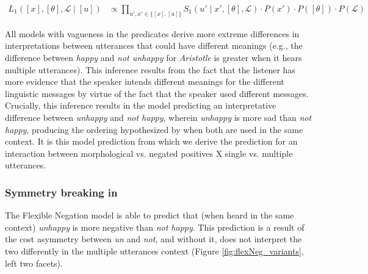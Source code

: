 \documentclass[floatsintext,doc]{apa6}
\begin{document}
\begin{align}
L_{1}([x], [\theta], \mathcal{L} \mid [u]) &\propto \prod_{{u', x'} \in \{[x],[u]\}} S_{1}(u' \mid x', [\theta], \mathcal{L}) \cdot P(x') \cdot  P([\theta]) \cdot P(\mathcal{L}) \label{eq:L1multi}
\end{align}


All models with vagueness in the predicates derive more extreme differences in interpretations between utterances that could have different meanings (e.g., the difference between \emph{happy} and \emph{not unhappy} for \emph{Aristotle} is greater when it hears multiple utterances).
This inference results from the fact that the listener has more evidence that the speaker intends different meanings for the different linguistic messages by virtue of the fact that the speaker used different messages.
Crucially, this inference results in the \emph{\ourmodel} model predicting an interpretative difference between \emph{unhappy} and \emph{not happy}, wherein \emph{unhappy} is more sad than \emph{not happy}, producing the ordering hypothesized by  when both are used in the same context.
It is this model prediction from which we derive the prediction for an interaction between morphological vs. negated positives X single vs. multiple utterances. 


\subsubsection{Symmetry breaking in \ourmodel}
%
The Flexible Negation model is able to predict that (when heard in the same context) \emph{unhappy} is more negative than \emph{not happy}.
This prediction is a result of the cost asymmetry between \emph{un} and \emph{not}, and without it, \ourmodel does not interpret the two differently in the multiple utterances context (Figure \ref{fig:flexNeg_variants}, left two facets).
\end{document}
